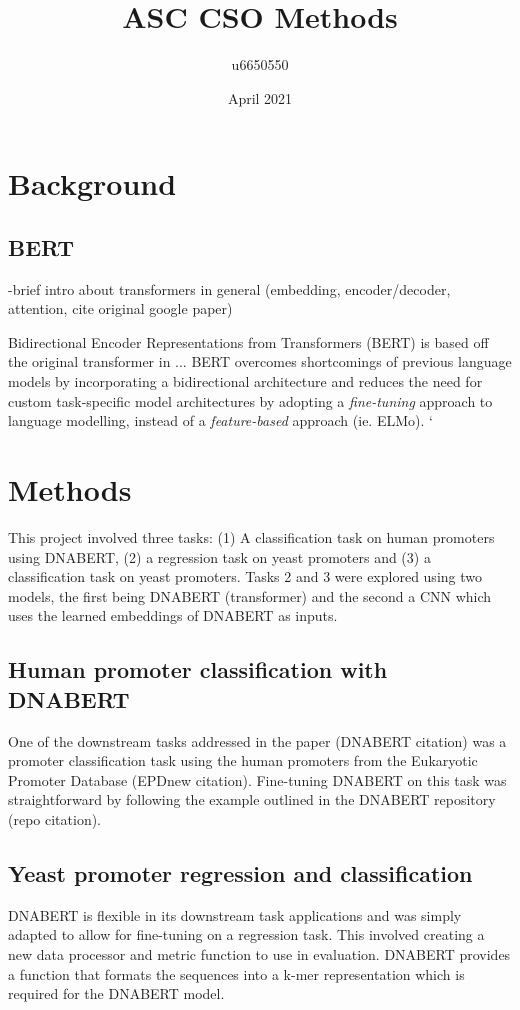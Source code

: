\documentclass{article}
\title{ASC CSO Methods}
\author{u6650550 }
\date{April 2021}
\begin{document}
\maketitle
\section{Background}
\subsection{BERT}
-brief intro about transformers in general (embedding, encoder/decoder, attention, cite original google paper)

Bidirectional Encoder Representations from Transformers (BERT) is based off the original transformer in ... BERT overcomes shortcomings of previous language models by incorporating a bidirectional architecture and reduces the need for custom task-specific model architectures by adopting a  \textit{fine-tuning} approach to language modelling, instead of a \textit{feature-based} approach (ie. ELMo). 
`
\section{Methods}
This project involved three tasks: (1) A classification task on human promoters using DNABERT, (2) a regression task on yeast promoters and (3) a classification task on yeast promoters. Tasks 2 and 3 were explored using two models, the first being DNABERT (transformer) and the second a CNN which uses the learned embeddings of DNABERT as inputs. 

\subsection{Human promoter classification with DNABERT}
One of the downstream tasks addressed in the paper (DNABERT citation) was a promoter classification task using the human promoters from the Eukaryotic Promoter Database (EPDnew citation). Fine-tuning DNABERT on this task was straightforward by following the example outlined in the DNABERT repository (repo citation).

\subsection{Yeast promoter regression and classification}
DNABERT is flexible in its downstream task applications and was simply adapted to allow for fine-tuning on a regression task. This involved creating a new data processor and metric function to use in evaluation. DNABERT provides a function that formats the sequences into a k-mer representation which is required for the DNABERT model.
\end{document}
